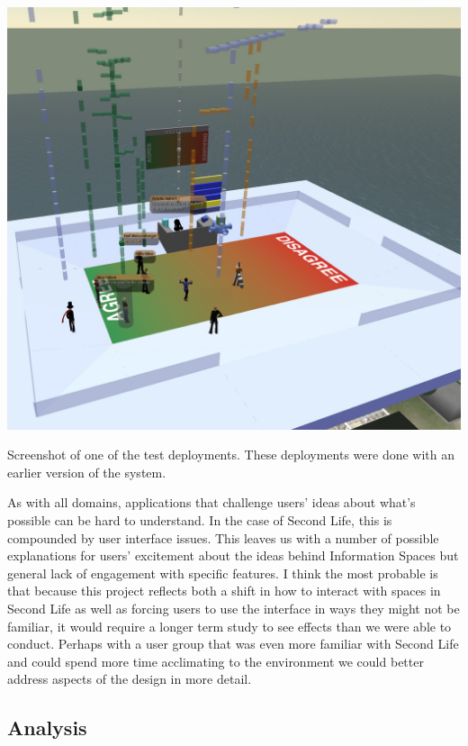 \begin{marginfigure}
	\includegraphics{figures/meeting_space_trial_2.jpg}
	\caption{Screenshot of one of the test deployments. These deployments were done with an earlier version of the system.}
	\label{fig:meeting_space_trial_2}
\end{marginfigure}



As with all domains, applications that challenge users' ideas about what's possible can be hard to understand. In the case of Second Life, this is compounded by user interface issues. This leaves us with a number of possible explanations for users' excitement about the ideas behind Information Spaces but general lack of engagement with specific features. I think the most probable is that because this project reflects both a shift in how to interact with spaces in Second Life as well as forcing users to use the interface in ways they might not be familiar, it would require a longer term study  to see effects than we were able to conduct. Perhaps with a user group that was even more familiar with Second Life and could spend more time acclimating to the environment we could better address aspects of the design in more detail.

\subsection{Analysis}

